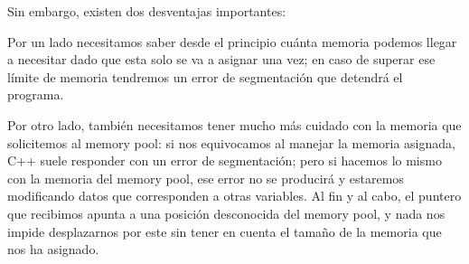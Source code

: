 Sin embargo, existen dos desventajas importantes:

Por un lado necesitamos saber desde el principio cuánta memoria podemos llegar a necesitar dado que esta solo se va a asignar una vez; en caso de superar ese límite de memoria tendremos un error de segmentación que detendrá el programa.

Por otro lado, también necesitamos tener mucho más cuidado con la memoria que solicitemos al memory pool: si nos equivocamos al manejar la memoria asignada, C++ suele responder con un error de segmentación; pero si hacemos lo mismo con la memoria del memory pool, ese error no se producirá y estaremos modificando datos que corresponden a otras variables. Al fin y al cabo, el puntero que recibimos apunta a una posición desconocida del memory pool, y nada nos impide desplazarnos por este sin tener en cuenta el tamaño de la memoria que nos ha asignado.
